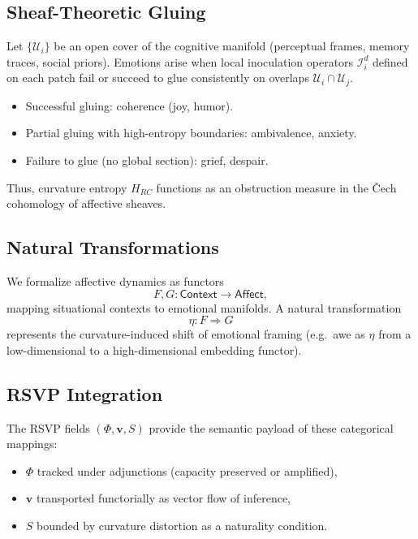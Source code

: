 \documentclass{article}
\theoremstyle{definition}
\begin{document}
\subsection{Sheaf-Theoretic Gluing}

Let $\{ \mathcal{U}_i \}$ be an open cover of the cognitive manifold 
(perceptual frames, memory traces, social priors).
Emotions arise when local inoculation operators $\mathcal{I}^d_i$ defined 
on each patch fail or succeed to glue consistently on overlaps 
$\mathcal{U}_i \cap \mathcal{U}_j$.

\begin{itemize}
  \item Successful gluing: coherence (joy, humor).
  \item Partial gluing with high-entropy boundaries: ambivalence, anxiety.
  \item Failure to glue (no global section): grief, despair.
\end{itemize}

Thus, curvature entropy $H_{RC}$ functions as an obstruction measure in 
the \v{C}ech cohomology of affective sheaves.

\subsection{Natural Transformations}

We formalize affective dynamics as functors
\[
F, G : \mathsf{Context} \to \mathsf{Affect},
\]
mapping situational contexts to emotional manifolds. 
A natural transformation
\[
\eta : F \Rightarrow G
\]
represents the curvature-induced shift of emotional framing 
(e.g.\ awe as $\eta$ from a low-dimensional to a high-dimensional embedding functor).

\subsection{RSVP Integration}

The RSVP fields $(\Phi, \mathbf{v}, S)$ provide the semantic payload of 
these categorical mappings:

\begin{itemize}
  \item $\Phi$ tracked under adjunctions (capacity preserved or amplified),
  \item $\mathbf{v}$ transported functorially as vector flow of inference,
  \item $S$ bounded by curvature distortion as a naturality condition.
\end{itemize}
\end{document}
